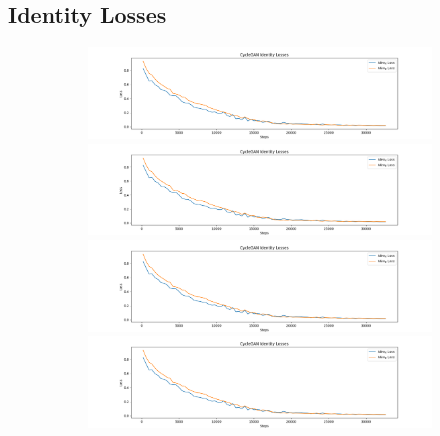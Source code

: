 \documentclass[12pt, fleqn, titlepage]{article}
\begin{document}
\subsection{Identity Losses}\label{iden_loss}
\begin{figure}[H]
	\centering
	\begin{subfigure}[b]{0.8\textwidth}
		\centering
		\includegraphics[width=\linewidth]{imgs/placeholder_identity_losses}
		\hfill
		\includegraphics[width=\linewidth]{imgs/placeholder_identity_losses}
		\hfill
		\includegraphics[width=\linewidth]{imgs/placeholder_identity_losses}
		\hfill
		\includegraphics[width=\linewidth]{imgs/placeholder_identity_losses}
	\end{subfigure}
\end{figure}
\end{document}
